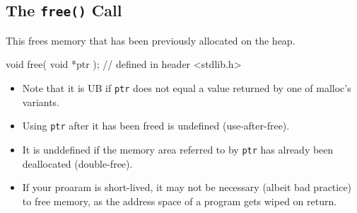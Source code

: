 \documentclass[11pt, a4paper]{article}
\theoremstyle{definition}
\theoremstyle{remark}
\begin{document}
\subsection{The \texttt{free()} Call}
This frees memory that has been previously allocated on the heap. 
\begin{ccode}
void free( void *ptr ); // defined in header <stdlib.h>
\end{ccode}
\begin{itemize}
  \item Note that it is UB if \texttt{ptr} does not equal a value returned by one of malloc's variants.
  \item Using \texttt{ptr} after it has been freed is undefined (use-after-free).
  \item It is unddefined if the memory area referred to by \texttt{ptr} has already been deallocated (double-free).
  \item If your proaram is short-lived, it may not be necessary (albeit bad practice) to free memory, as the address space of a program gets wiped on return.
\end{itemize}
\end{document}
